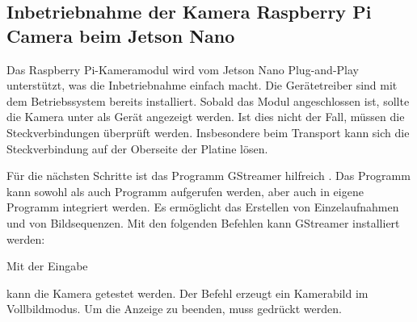 %
%



\subsection{Inbetriebnahme der Kamera Raspberry Pi Camera beim Jetson Nano}

Das Raspberry Pi-Kameramodul wird vom Jetson Nano Plug-and-Play unterstützt, was die Inbetriebnahme einfach macht. Die Gerätetreiber sind mit dem Betriebssystem bereits installiert. Sobald das Modul angeschlossen ist, sollte die Kamera unter  als Gerät angezeigt werden. Ist dies nicht der Fall, müssen die  Steckverbindungen überprüft werden. Insbesondere beim Transport kann sich die Steckverbindung auf der Oberseite der Platine lösen.

Für die nächsten Schritte ist das Programm GStreamer hilfreich \cite{GStreamer:2021}. Das Programm kann sowohl als auch  Programm aufgerufen werden, aber auch in eigene Programm integriert werden. Es ermöglicht das Erstellen von Einzelaufnahmen und von Bildsequenzen. Mit den folgenden Befehlen kann GStreamer installiert werden:

\medskip







\medskip

Mit der Eingabe 

\medskip


\medskip

kann die Kamera getestet werden. Der Befehl erzeugt ein Kamerabild im Vollbildmodus. Um die Anzeige zu beenden, muss   gedrückt werden.

